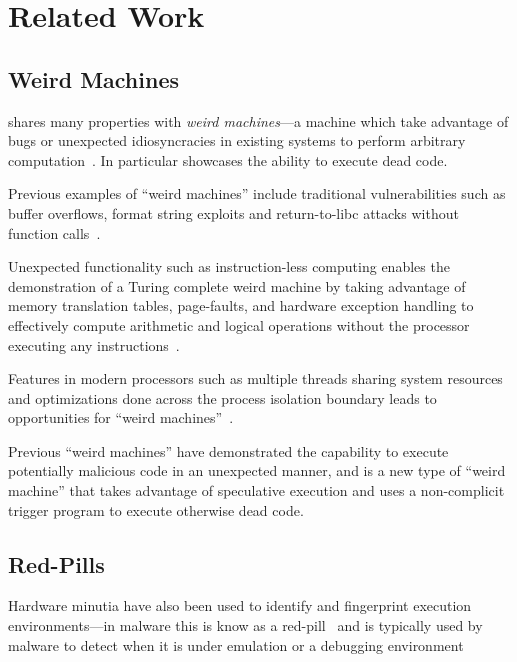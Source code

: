 \section{Related Work}
\label{sec:related-work}


\subsection{Weird Machines}

\speculake shares many properties with \textit{weird machines}---a machine which
take advantage of bugs or unexpected idiosyncracies in existing systems to
perform arbitrary
computation~\cite{weird_machines,bratus2011exploit}. In
particular \speculake showcases the ability to execute dead code.

Previous examples of ``weird machines'' include traditional vulnerabilities such
as buffer overflows, format string exploits and return-to-libc attacks without
function calls~\cite{buffer_overflow, format_string_exploit,
shacham2007geometry}. 

Unexpected functionality such as instruction-less computing enables the
demonstration of a Turing complete weird machine by taking advantage of memory
translation tables, page-faults, and hardware exception handling to effectively
compute arithmetic and logical operations without the processor executing any
instructions~\cite{bangert2013page}.

Features in modern processors such as multiple threads sharing system resources
and optimizations done across the process isolation boundary leads to
opportunities for ``weird machines''~\cite{d2015exploiting}.

Previous ``weird machines'' have demonstrated the capability to execute
potentially malicious code in an unexpected manner, and \speculake is a new type
of ``weird machine'' that takes advantage of speculative execution and uses a
non-complicit trigger program to execute otherwise dead code.

\subsection{Red-Pills}
Hardware minutia have also been used to identify and fingerprint execution
environments---in malware this is know as a red-pill~\cite{red-pill} and is
typically used by malware to detect when it is under emulation or a debugging
environment~\cite{lindorfer2011detecting, balzarotti2010efficient,
paleari2009fistful}

